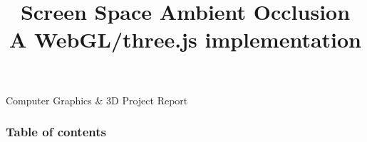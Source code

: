 \documentclass{beamer}
\title[]{Screen Space Ambient Occlusion \\\small A WebGL/three.js implementation}
\author[Ivan Prosperi]{
    \usebox{\authbox}}
\institute[]{Universit\`a degli Studi di Firenze}
\date{}
\begin{document}
\begin{frame}
    \titlepage
    \centering
    \vspace*{-1.3cm}
    Computer Graphics \& 3D Project Report
\end{frame}

\begin{frame}
    \frametitle{Table of contents}
    \tableofcontents
\end{frame}



\end{document}
